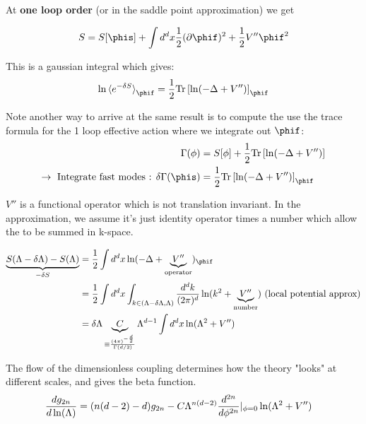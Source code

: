 \documentclass[11pt]{scrartcl}
\begin{document}
At {\bf one loop order} (or in the saddle point approximation) we get

\begin{align}
	S = S[ {\phis} ] + \int d^d x \frac12 ( \partial \phif )^2 + \frac12 V'' \phif^2
	\end{align}

This is a gaussian integral which gives:
\begin{align}
	\ln \braket{e^{-\delta S}}_{\phif} = \frac12 \text{Tr} \left[ \ln( -\Delta + V'') \right]_\phif
	\end{align}

Note another way to arrive at the same result is to compute the use the trace formula for the 1 loop effective action where we integrate out $\phif$:
\begin{align}
	\Gamma(\phi) &= S[\phi] + \frac12 \text{Tr} \left[ \ln( -\Delta + V'') \right] \\
	\rightarrow \text{ Integrate fast modes : } 
	\delta \Gamma(\phis) &= \frac12 \text{Tr} \left[ \ln( -\Delta + V'') \right]_{\phif}
	\end{align}

$V''$ is a functional operator which is not translation invariant.  In the  approximation, we assume it's just identity operator times a number which allow the to be summed in k-space.

\begin{align}
	\underbrace{S(\Lambda-\delta \Lambda) - S(\Lambda)}_{-\delta S} &= \frac12 \int d^d x \ln(-\Delta + \underbrace{V''}_{\text{operator}})_{\phif} \\
	 &= \frac12 \int d^d x \int_{k \in (\Lambda - \delta \Lambda, \Lambda)} {d^d k \over (2 \pi)^d} \ln (k^2 + \underbrace{V''}_{\text{number}})   \text{ (local potential approx)} \\
	 & = \delta \Lambda \underbrace{C}_{\equiv {{(4 \pi)^{-{d \over 2}}  \over \Gamma(d/2)}}} \Lambda^{d-1} \int d^d x \ln(\Lambda^2 + V'' ) \label{eq:2}
	\end{align}

The flow of the dimensionless coupling determines how the theory "looks" at different scales, and gives the beta function.
\begin{align}
	{d g_{2n} \over d \ln(\Lambda)} &= (n(d-2)-d) g_{2n} - C \Lambda^{n(d-2)} {d^{2n} \over d \phi^{2n}}|_{\phi=0} \ln (\Lambda^2 + V'') \label{eq:1}
	\end{align}
\end{document}
